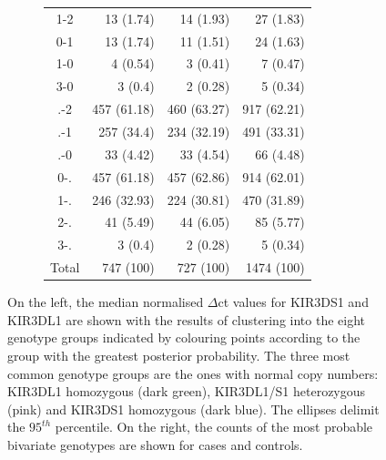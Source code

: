 \begin{figure}[h]
\begin{subfigure}[c]{.4\textwidth}
\begin{tabular}{crrr}
        1-2 & 13 (1.74) & 14 (1.93) & 27 (1.83) \\ 
        0-1 & 13 (1.74) & 11 (1.51) & 24 (1.63) \\ 
        1-0 & 4 (0.54) & 3 (0.41) & 7 (0.47) \\ 
        3-0 & 3 (0.4) & 2 (0.28) & 5 (0.34) \\ 
      \midrule
      .-2 & 457 (61.18) & 460 (63.27) & 917 (62.21) \\ 
      .-1 & 257 (34.4) & 234 (32.19) & 491 (33.31) \\ 
      .-0 & 33 (4.42) & 33 (4.54) & 66 (4.48) \\ 
      \midrule
        0-. & 457 (61.18) & 457 (62.86) & 914 (62.01) \\ 
        1-. & 246 (32.93) & 224 (30.81) & 470 (31.89) \\ 
        2-. & 41 (5.49) & 44 (6.05) & 85 (5.77) \\ 
        3-. & 3 (0.4) & 2 (0.28) & 5 (0.34) \\ 
      \midrule
      Total &  747 (100) & 727 (100) & 1474 (100)\\ 
      \bottomrule
    \end{tabular}
    \end{subfigure}
    \caption{
        \label{figure:fuzzy-genotyping}
        On the left,
        the median normalised $\Delta$ct values for KIR3DS1 and KIR3DL1 are shown with
        the results of clustering into the eight genotype groups indicated by colouring points according to the group
        with the greatest posterior probability.
        The three most common genotype groups are the ones with normal copy numbers:
        KIR3DL1 homozygous (dark green), KIR3DL1/S1 heterozygous (pink) and KIR3DS1 homozygous (dark blue).
        The ellipses delimit the $95^{th}$ percentile.
        On the right, the counts of the most probable bivariate genotypes are shown for cases and controls.
    }
\end{figure}






\clearpage

